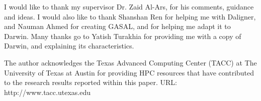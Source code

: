 

\vskip 1cm

I would like to thank my supervisor Dr. Zaid Al-Ars, for his comments, guidance and ideas.
I would also like to thank Shanshan Ren for helping me with Daligner, and Nauman Ahmed for creating GASAL, and for helping me adapt it to Darwin.
Many thanks go to Yatish Turakhia for providing me with a copy of Darwin, and explaining its characteristics.

The author acknowledges the Texas Advanced Computing Center (TACC) at The University of Texas at Austin for providing HPC resources that have contributed to the research results reported within this paper. URL: http://www.tacc.utexas.edu




\vskip 2cm
\noindent \AUTHOR \\
\PLACE \\
\DATE

